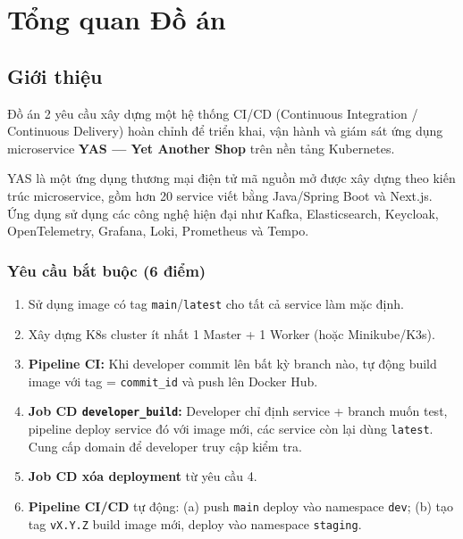 \chapter{Tổng quan Đồ án}

\section{Giới thiệu}

Đồ án 2 yêu cầu xây dựng một hệ thống CI/CD (Continuous Integration / Continuous Delivery)
hoàn chỉnh để triển khai, vận hành và giám sát ứng dụng microservice
\textbf{YAS — Yet Another Shop} trên nền tảng Kubernetes.

YAS là một ứng dụng thương mại điện tử mã nguồn mở được xây dựng theo kiến trúc microservice,
gồm hơn 20 service viết bằng Java/Spring Boot và Next.js. Ứng dụng sử dụng các
công nghệ hiện đại như Kafka, Elasticsearch, Keycloak, OpenTelemetry, Grafana, Loki, Prometheus và Tempo.

\subsection{Yêu cầu bắt buộc (6 điểm)}

\begin{enumerate}[label=\textbf{YC\arabic*.}]
  \item Sử dụng image có tag \texttt{main}/\texttt{latest} cho tất cả service làm mặc định.
  \item Xây dựng K8s cluster ít nhất 1 Master + 1 Worker (hoặc Minikube/K3s).
  \item \textbf{Pipeline CI:} Khi developer commit lên bất kỳ branch nào, tự động build image
        với tag = \texttt{commit\_id} và push lên Docker Hub.
  \item \textbf{Job CD \texttt{developer\_build}:} Developer chỉ định service + branch muốn test,
        pipeline deploy service đó với image mới, các service còn lại dùng \texttt{latest}.
        Cung cấp domain để developer truy cập kiểm tra.
  \item \textbf{Job CD xóa deployment} từ yêu cầu 4.
  \item \textbf{Pipeline CI/CD} tự động: (a) push \texttt{main} \textrightarrow{} deploy vào namespace \texttt{dev};
        (b) tạo tag \texttt{vX.Y.Z} \textrightarrow{} build image mới, deploy vào namespace \texttt{staging}.
\end{enumerate}

